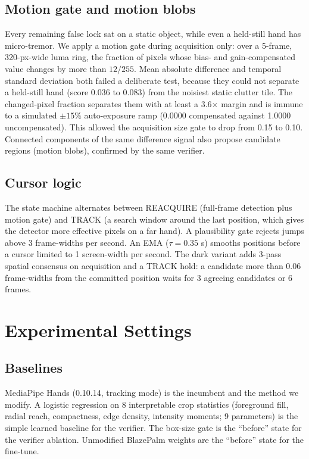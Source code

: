 \documentclass[conference,a4paper]{IEEEtran}
\begin{document}
\subsection{Motion gate and motion blobs}
\label{subsec:motion}
Every remaining false lock sat on a static object, while even a held-still
hand has micro-tremor. We apply a motion gate during acquisition only: over
a 5-frame, 320-px-wide luma ring, the fraction of pixels whose bias- and
gain-compensated value changes by more than $12/255$. Mean absolute
difference and temporal standard deviation both failed a deliberate test,
because they could not separate a held-still hand (score 0.036 to 0.083)
from the noisiest static clutter tile. The changed-pixel fraction separates
them with at least a 3.6$\times$ margin and is immune to a simulated
$\pm15\%$ auto-exposure ramp (0.0000 compensated against 1.0000
uncompensated). This allowed the acquisition size gate to drop from 0.15 to
0.10. Connected components of the same difference signal also propose
candidate regions (motion blobs), confirmed by the same verifier.

\subsection{Cursor logic}
The state machine alternates between REACQUIRE (full-frame detection plus
motion gate) and TRACK (a search window around the last position, which
gives the detector more effective pixels on a far hand). A plausibility
gate rejects jumps above 3 frame-widths per second. An EMA ($\tau=0.35$ s)
smooths positions before a cursor limited to 1 screen-width per second. The
dark variant adds 3-pass spatial consensus on acquisition and a TRACK hold:
a candidate more than 0.06 frame-widths from the committed position waits
for 3 agreeing candidates or 6 frames.

\section{Experimental Settings}

\subsection{Baselines}
MediaPipe Hands (0.10.14, tracking mode) is the incumbent and the method we
modify. A logistic regression on 8 interpretable crop statistics
(foreground fill, radial reach, compactness, edge density, intensity
moments; 9 parameters) is the simple learned baseline for the verifier. The
box-size gate is the ``before'' state for the verifier ablation.
Unmodified BlazePalm weights are the ``before'' state for the fine-tune.
\end{document}
